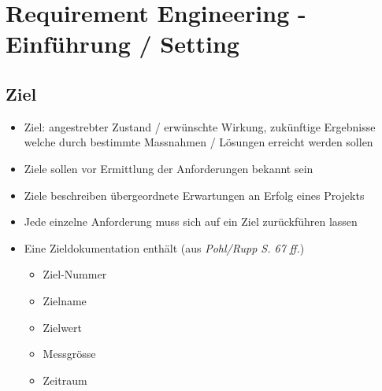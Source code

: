 \documentclass[a4paper]{article}
\begin{document}
\newpage
				
	\section{Requirement Engineering - Einführung / Setting}
	
		\subsection{Ziel}
		
		\begin{itemize}
			\item Ziel: angestrebter Zustand / erwünschte Wirkung, zukünftige Ergebnisse welche durch bestimmte Massnahmen / Lösungen erreicht werden sollen
			\item Ziele sollen vor Ermittlung der Anforderungen bekannt sein
			\item Ziele beschreiben übergeordnete Erwartungen an Erfolg eines Projekts
			\item Jede einzelne Anforderung muss sich auf ein Ziel zurückführen lassen
			\item Eine Zieldokumentation enthält (aus \textit{Pohl/Rupp S. 67 ff.})
				\begin{itemize}
					\item Ziel-Nummer
					\item Zielname
					\item Zielwert
					\item Messgrösse
					\item Zeitraum
				\end{itemize}
		\end{itemize}
	
\end{document}

